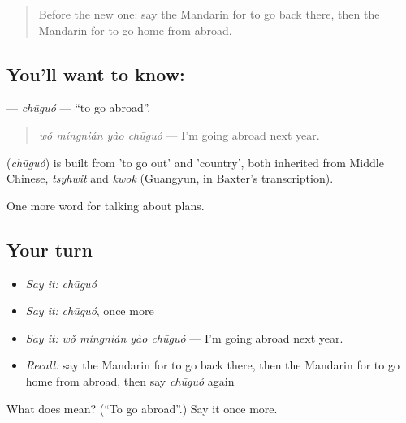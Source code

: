 \label{lesson:ZH-C191-chuguo}



\begin{quote}
Before the new one: say the Mandarin for to go back there, then the Mandarin for to go home from abroad.
\end{quote}

\subsection*{You'll want to know: }
\textbf{} — \emph{chūguó} — \textquotedblleft{}to go abroad\textquotedblright{}.

\begin{quote}
\textbf{} \emph{wǒ míngnián yào chūguó} — I'm going abroad next year.
\end{quote}

\begin{cousinweb}
\textbf{} (\emph{chūguó}) is built from  'to go out' and  'country', both inherited from Middle Chinese, \emph{tsyhwit} and \emph{kwok} (Guangyun, in Baxter's transcription).
\end{cousinweb}

\begin{grammarlens}[title={What you've built}]
One more word for talking about plans.
\end{grammarlens}

\subsection*{Your turn}
\begin{itemize}
\raggedright
  \item \emph{Say it:} \emph{chūguó}
  \item \emph{Say it:} \emph{chūguó}, once more
  \item \emph{Say it:} \emph{wǒ míngnián yào chūguó} — I'm going abroad next year.
  \item \emph{Recall:} say the Mandarin for to go back there, then the Mandarin for to go home from abroad, then say \emph{chūguó} again
\end{itemize}

\begin{tcolorbox}[breakable,colback=teal!4,colframe=teal!35!black,title={Before you move on}]
What does  mean? (\textquotedblleft{}To go abroad\textquotedblright{}.) Say it once more.
\end{tcolorbox}
